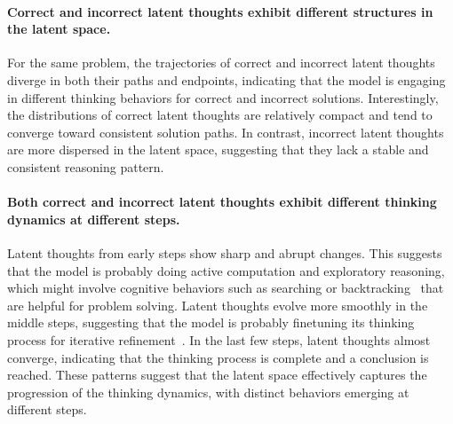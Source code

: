 \documentclass{article} %
\begin{document}
\paragraph*{Correct and incorrect latent thoughts exhibit different structures in the latent space.}
\vspace{-0.1cm}
For the same problem, the trajectories of correct and incorrect latent thoughts diverge in both their paths and endpoints, indicating that the model is engaging in different thinking behaviors for correct and incorrect solutions.
%
Interestingly, the distributions of correct latent thoughts are relatively compact and tend to converge toward consistent solution paths. In contrast, incorrect latent thoughts are more dispersed in the latent space, suggesting that they lack a stable and consistent reasoning pattern.
%
\vspace{-0.1cm}
\paragraph*{Both correct and incorrect latent thoughts exhibit different thinking dynamics at different steps.}
\vspace{-0.1cm}
Latent thoughts from early steps show sharp and abrupt changes.
%
This suggests that the model is probably doing active computation and exploratory reasoning, which might involve cognitive behaviors such as searching or backtracking~\citep{gandhi2025cognitive} that are helpful for problem solving.
%
Latent thoughts evolve more smoothly in the middle steps, suggesting that the model is probably finetuning its thinking process for iterative refinement~\citep{madaan2023self}.
%
In the last few steps, latent thoughts almost converge, indicating that the thinking process is complete and a conclusion is reached.
%
These patterns suggest that the latent space effectively captures the progression of the thinking dynamics, with distinct behaviors emerging at different steps.
\vspace{-0.1cm}
\end{document}
